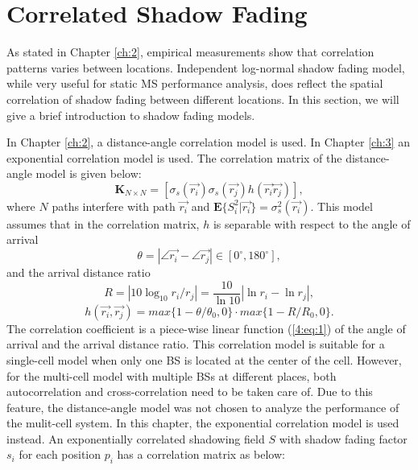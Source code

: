  \section{Correlated Shadow Fading}
 \label{4:CorrShadowField}
 As stated in Chapter \ref{ch:2}, empirical measurements show that correlation patterns varies between locations. Independent log-normal shadow fading model, while very useful for static MS performance analysis, does reflect the spatial correlation of shadow fading between different locations. In this section, we will give a brief introduction to shadow fading models.
 
 In Chapter \ref{ch:2}, a distance-angle correlation model is used. In Chapter \ref{ch:3} an exponential correlation model is used. The correlation matrix of the distance-angle model is given below:
 \begin{equation}
 \mathbf{K}_{N\times N} = [ \sigma_{s}(\vec{r_{i}})\sigma_{s}(\vec{r_{j}})h(\vec{r_{i}}\vec{r_{j}})],
 \label{4:correlationmatrix}
 \end{equation}
 where $N$ paths interfere with path $\vec{r_{i}}$ and $\mathbf{E}\{S_{i}^{2}|\vec{r_{i}}\}=\sigma_{s}^{2}(\vec{r_{i}})$. This model assumes that in the correlation matrix, $h$ is separable with respect to the angle of arrival
 \begin{equation}
 \theta = |\angle\vec{r_{i}}-\angle\vec{r_{j}}|\in [0^{\circ},180^{\circ}],
 \end{equation}
 and the arrival distance ratio
 \begin{equation}
 R=|10\log_{10}r_{i}/r_{j}|=\frac{10}{\ln 10}|\ln r_{i}-\ln r_{j}|,
 \end{equation}
 \begin{equation}
 h(\vec{r_{i}},\vec{r_{j}})=max\{1-\theta/\theta_{0},0\}\cdot max\{1-R/R_{0},0\}.
 \label{4:eq:1}
 \end{equation}
 The correlation coefficient is a piece-wise linear function (\ref{4:eq:1}) of the angle of arrival and the arrival distance ratio. This correlation model is suitable for a single-cell model when only one BS is located at the center of the cell. However, for the multi-cell model with multiple BSs at different places, both autocorrelation and cross-correlation need to be taken care of. 
 Due to this feature, the distance-angle model was not chosen to analyze the performance of the mulit-cell system. In this chapter, the exponential correlation model is used instead. An exponentially correlated shadowing field $S$ with shadow fading factor $s_{i}$ for each position $p_{i}$ has a correlation matrix as below:
